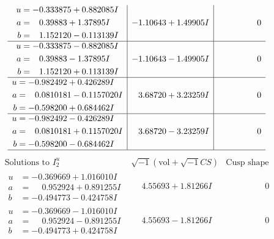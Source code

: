 \documentclass[1p]{elsarticle_modified}
\theoremstyle{definition}
\newcommand{\I}{\sqrt{-1}}
\begin{document}
$$\begin{array}{c|c|c}
\begin{aligned}
u &= -0.333875 + 0.882085 I \\
a &= \phantom{-}0.39883 + 1.37895 I \\
b &= \phantom{-}1.152120 - 0.113139 I\end{aligned}
 & -1.10643 + 1.49905 I & \phantom{-0.000000 } 0 \\ \hline\begin{aligned}
u &= -0.333875 - 0.882085 I \\
a &= \phantom{-}0.39883 - 1.37895 I \\
b &= \phantom{-}1.152120 + 0.113139 I\end{aligned}
 & -1.10643 - 1.49905 I & \phantom{-0.000000 } 0 \\ \hline\begin{aligned}
u &= -0.982492 + 0.426289 I \\
a &= \phantom{-}0.0810181 - 0.1157020 I \\
b &= -0.598200 + 0.684462 I\end{aligned}
 & \phantom{-}3.68720 + 3.23259 I & \phantom{-0.000000 } 0 \\ \hline\begin{aligned}
u &= -0.982492 - 0.426289 I \\
a &= \phantom{-}0.0810181 + 0.1157020 I \\
b &= -0.598200 - 0.684462 I\end{aligned}
 & \phantom{-}3.68720 - 3.23259 I & \phantom{-0.000000 } 0\\
 \hline 
 \end{array}$$\newpage$$\begin{array}{c|c|c}  
\text{Solutions to }I^u_{2}& \I (\text{vol} + \sqrt{-1}CS) & \text{Cusp shape}\\
 \hline 
\begin{aligned}
u &= -0.369669 + 1.016010 I \\
a &= \phantom{-}0.952924 + 0.891255 I \\
b &= -0.494773 - 0.424758 I\end{aligned}
 & \phantom{-}4.55693 + 1.81266 I & \phantom{-0.000000 } 0 \\ \hline\begin{aligned}
u &= -0.369669 - 1.016010 I \\
a &= \phantom{-}0.952924 - 0.891255 I \\
b &= -0.494773 + 0.424758 I\end{aligned}
 & \phantom{-}4.55693 - 1.81266 I & \phantom{-0.000000 } 0 \\ \hline\begin{aligned}

\end{aligned}
\end{array}$$
\end{document}
